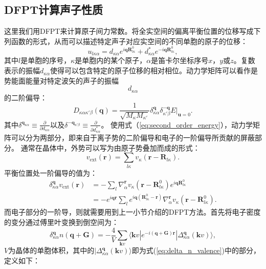 \subsection{DFPT计算声子性质}
这里我们用DFPT来计算原子间力常数。将全实空间的偏离平衡位置的位移写成下列函数的形式，从而可以描述特定声子对应实空间的不同单胞的原子的位移：
\begin{equation}
  u_{l\kappa\alpha} = d_{\kappa\alpha}e^{i\bm{q}\bm{R}^0_{l\kappa}} + d^*_{\kappa\alpha}e^{-i\bm{q}\bm{R}^0_{l\kappa}},
\end{equation}
其中$l$是单胞的序号，$\kappa$是单胞内的某个原子，$\alpha$是笛卡尔坐标序号$x$，$y$或$z$。复数表示的振幅$d_{\kappa\alpha}$使得可以包含特定的原子位移的相对相位。动力学矩阵可以看作是势能面能量对特定波矢的声子的振幅$$d_{\kappa\alpha}$$的二阶偏导：
\begin{equation}
  D_{\kappa\alpha\kappa'\beta}(\bm{q}) =
  \frac{1}{\sqrt{M_\kappa M_{\kappa'}}} \delta^{\bm{q}}_{\kappa\alpha} \delta^{-\bm{q}}_{\kappa'\beta} E \bigg|_{\bm{u}=0}.
\end{equation}
其中$\delta^{\bm{q}_{\kappa\alpha}}\equiv \frac{\partial}{\partial d_{\kappa\alpha}}$以及$\delta^{\bm{-q}_{\kappa'\beta}}\equiv \frac{\partial}{\partial d^*_{\kappa\alpha}}$。
使用式（\ref{eq:second_order_energy}），动力学矩阵可以分为两部分，即来自于离子势的二阶偏导和电子的一阶偏导所贡献的屏蔽部分。
通常在晶体中，外势可以写为由原子势叠加而成的形式：
\begin{equation}
  v_\mathrm{ext}(\bm{r}) = \sum_{l\kappa} v_\kappa (\bm{r}-\bm{R}_{l\kappa}).
\end{equation}
平衡位置处一阶偏导的值为：
\begin{align}
  \delta^{\bm{q}}_{\kappa\alpha}v_{\mathrm{ext}}(\bm{r}) &=
  - \sum_l \nabla^{\bm{r}}_\alpha v_\kappa (\bm{r}-\bm{R}^0_{l\kappa})e^{i\bm{q}\bm{R}^0_{l\kappa}} \\
  &= -e^{i\bm{qr}} \sum_l e^{i\bm{q} (\bm{R}^0_{l\kappa}-\bm{r})} \nabla^{\bm{r}}_\alpha v_\kappa(\bm{r}-\bm{R}^0_{l\kappa}).
\end{align}
而电子部分的一阶导，则就需要用到上一小节介绍的DFPT方法。首先将电子密度的变分通过傅里叶变换到倒空间为：
\begin{equation}\label{eq:dftp_scf01}
  \delta^{\bm{q}}_{\kappa\alpha} n(\bm{q}+\bm{G}) = - \frac{4}{V}\sum_{\bm{k}v} \langle \bm{k}v| e^{-i(\bm{q}+\bm{G})\bm{r}}| \Delta^{\bm{q}}_{\kappa\alpha}(\bm{k}v) \rangle,
\end{equation}
$V$为晶体的单胞体积，其中的$|\Delta^{\bm{q}}_{\kappa\alpha}(\bm{k}v) \rangle$即为式(\ref{eq:delta_n_valence})中的部分，定义如下：
